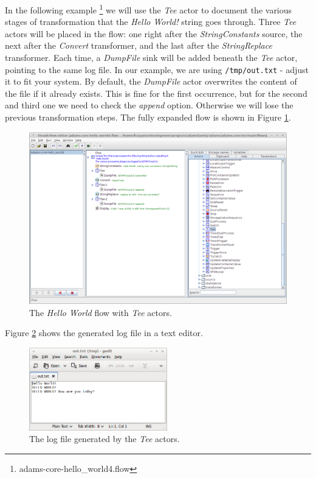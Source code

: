 In the following example \footnote{adams-core-hello\_world4.flow} we will use
the \textit{Tee} actor to document the various stages of transformation that the
\textit{Hello World!} string goes
through. Three \textit{Tee} actors will be placed in the flow: one right after
the \textit{StringConstants} source, the next after the \textit{Convert}
transformer, and the last after the \textit{StringReplace} transformer.
Each time, a \textit{DumpFile} sink will be added beneath the \textit{Tee}
actor, pointing to the same log file. In our example, we are using
\texttt{/tmp/out.txt} - adjust it to fit your system. By default, the
\textit{DumpFile} actor overwrites the content of the file if it already exists.
This is fine for the first occurrence, but for the second and third one we need
to check the \textit{append} option. Otherwise we will lose the previous
transformation steps. The fully expanded flow is shown in Figure
\ref{floweditor-helloworld-tee_flow}.
\begin{figure}[htb]
  \centering
  \includegraphics[width=12.0cm]{images/floweditor-helloworld-tee_flow.png}
  \caption{The \textit{Hello World} flow with \textit{Tee} actors.}
  \label{floweditor-helloworld-tee_flow}
\end{figure}
Figure \ref{floweditor-helloworld-tee_logfile} shows the generated log file in a
text editor.
\begin{figure}[htb]
  \centering
  \includegraphics[width=6.0cm]{images/floweditor-helloworld-tee_logfile.png}
  \caption{The log file generated by the \textit{Tee} actors.}
  \label{floweditor-helloworld-tee_logfile}
\end{figure}

